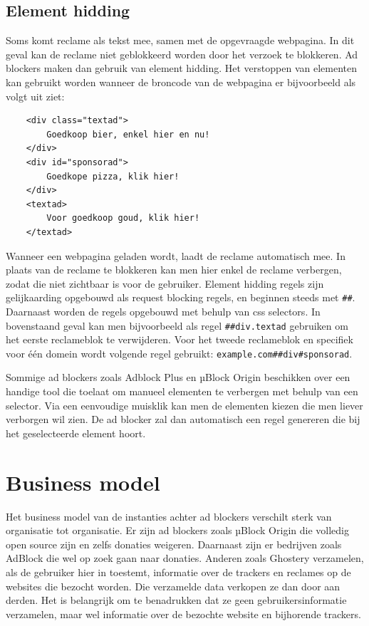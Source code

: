 \documentclass[pdftex,a4paper,12pt,twoside]{report}
\begin{document}
\subsection{ Element hidding}
\label{sec:Element hidding}
Soms komt reclame als tekst mee, samen met de opgevraagde webpagina. In dit geval kan de reclame niet geblokkeerd worden door het verzoek te blokkeren. Ad blockers maken dan gebruik van element hidding. Het verstoppen van elementen kan gebruikt worden wanneer de broncode van de webpagina er bijvoorbeeld als volgt uit ziet:
\lstset{language=Html,tabsize=2}  
\begin{lstlisting}
	<div class="textad">
		Goedkoop bier, enkel hier en nu!
	</div>
	<div id="sponsorad">
		Goedkope pizza, klik hier!
	</div>
	<textad>
		Voor goedkoop goud, klik hier!
	</textad>
\end{lstlisting}

Wanneer een webpagina geladen wordt, laadt de reclame automatisch mee. In plaats van de reclame te blokkeren kan men hier enkel de reclame verbergen, zodat die niet zichtbaar is voor de gebruiker. Element hidding regels zijn gelijkaarding opgebouwd als request blocking regels, en beginnen steeds met \texttt{\#\#}. Daarnaast worden de regels opgebouwd met behulp van css selectors. In bovenstaand geval kan men bijvoorbeeld als regel \texttt{\#\#div.textad} gebruiken om het eerste reclameblok te verwijderen. Voor het tweede reclameblok en specifiek voor één domein wordt volgende regel gebruikt: \texttt{example.com\#\#div\#sponsorad}.

Sommige ad blockers zoals Adblock Plus en µBlock Origin beschikken over een handige tool die toelaat om manueel elementen te verbergen met behulp van een selector. Via een eenvoudige muisklik kan men de elementen kiezen die men liever verborgen wil zien. De ad blocker zal dan automatisch een regel genereren die bij het geselecteerde element hoort.

\section{Business model}
\label{sec:Business model}
Het business model van de instanties achter ad blockers verschilt sterk van organisatie tot organisatie. Er zijn ad blockers zoals µBlock Origin die volledig open source zijn en zelfs donaties weigeren. Daarnaast zijn er bedrijven zoals AdBlock die wel op zoek gaan naar donaties. Anderen zoals Ghostery verzamelen, als de gebruiker hier in toestemt, informatie over de trackers en reclames op de websites die bezocht worden. Die verzamelde data verkopen ze dan door aan derden. Het is belangrijk om te benadrukken dat ze geen gebruikersinformatie verzamelen, maar wel informatie over de bezochte website en bijhorende trackers.
\end{document}
